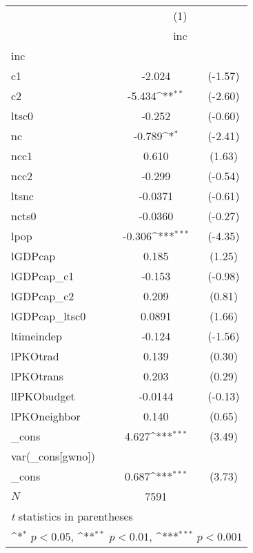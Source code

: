{
\def\sym#1{\ifmmode^{#1}\else\(^{#1}\)\fi}
\begin{tabular}{l*{1}{cc}}
\hline\hline
            &\multicolumn{2}{c}{(1)}           \\
            &\multicolumn{2}{c}{inc}           \\
\hline
inc         &                     &            \\
c1          &      -2.024         &     (-1.57)\\
c2          &      -5.434\sym{**} &     (-2.60)\\
ltsc0       &      -0.252         &     (-0.60)\\
nc          &      -0.789\sym{*}  &     (-2.41)\\
ncc1        &       0.610         &      (1.63)\\
ncc2        &      -0.299         &     (-0.54)\\
ltsnc       &     -0.0371         &     (-0.61)\\
ncts0       &     -0.0360         &     (-0.27)\\
lpop        &      -0.306\sym{***}&     (-4.35)\\
lGDPcap     &       0.185         &      (1.25)\\
lGDPcap\_c1  &      -0.153         &     (-0.98)\\
lGDPcap\_c2  &       0.209         &      (0.81)\\
lGDPcap\_ltsc0&      0.0891         &      (1.66)\\
ltimeindep  &      -0.124         &     (-1.56)\\
lPKOtrad    &       0.139         &      (0.30)\\
lPKOtrans   &       0.203         &      (0.29)\\
llPKObudget &     -0.0144         &     (-0.13)\\
lPKOneighbor&       0.140         &      (0.65)\\
\_cons      &       4.627\sym{***}&      (3.49)\\
\hline
var(\_cons[gwno])&                     &            \\
\_cons      &       0.687\sym{***}&      (3.73)\\
\hline
\(N\)       &        7591         &            \\
\hline\hline
\multicolumn{3}{l}{\footnotesize \textit{t} statistics in parentheses}\\
\multicolumn{3}{l}{\footnotesize \sym{*} \(p<0.05\), \sym{**} \(p<0.01\), \sym{***} \(p<0.001\)}\\
\end{tabular}
}
